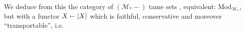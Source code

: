 We deduce from this the category of $(\mathcal M_*-)$ tame sets , equivalent: $\mathrm{Mod}_{\mathcal M_*}$, but with a functor
\qquad$X\mathrel{\mapstochar\relbar}|X|$
which is faithful, conservative and moreover ``transportable'', i.e.
